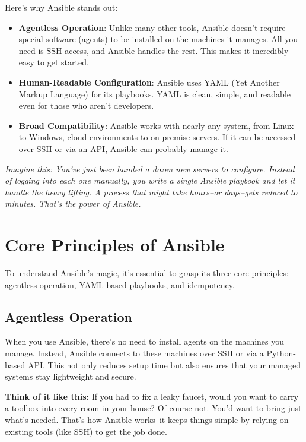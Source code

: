 Here's why Ansible stands out:
\begin{itemize}
    \item \textbf{Agentless Operation}: Unlike many other tools, Ansible doesn't require special software (agents) to be installed on the machines it manages. All you need is SSH access, and Ansible handles the rest. This makes it incredibly easy to get started.
    \item \textbf{Human-Readable Configuration}: Ansible uses YAML (Yet Another Markup Language) for its playbooks. YAML is clean, simple, and readable even for those who aren't developers.
    \item \textbf{Broad Compatibility}: Ansible works with nearly any system, from Linux to Windows, cloud environments to on-premise servers. If it can be accessed over SSH or via an API, Ansible can probably manage it.
\end{itemize}

\textit{Imagine this: You've just been handed a dozen new servers to configure. Instead of logging into each one manually, you write a single Ansible playbook and let it handle the heavy lifting. A process that might take hours--or days--gets reduced to minutes. That's the power of Ansible.}

\section{Core Principles of Ansible}

To understand Ansible's magic, it's essential to grasp its three core principles: agentless operation, YAML-based playbooks, and idempotency.

\subsection{Agentless Operation}

When you use Ansible, there's no need to install agents on the machines you manage. Instead, Ansible connects to these machines over SSH or via a Python-based API. This not only reduces setup time but also ensures that your managed systems stay lightweight and secure.

\textbf{Think of it like this:} If you had to fix a leaky faucet, would you want to carry a toolbox into every room in your house? Of course not. You'd want to bring just what's needed. That's how Ansible works--it keeps things simple by relying on existing tools (like SSH) to get the job done.

